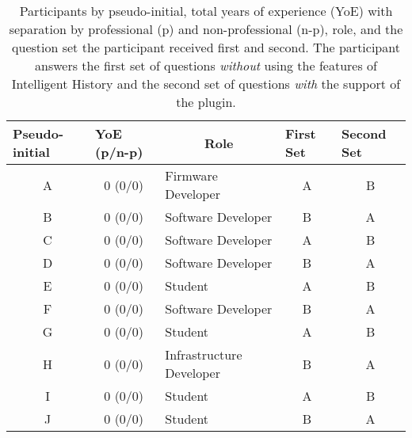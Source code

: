\begin{table}[h]
  \centering
  \begin{tabular}{@{}cclcc@{}}
  \toprule
  \multicolumn{1}{l}{Pseudo-initial} & \multicolumn{1}{l}{YoE (p/n-p)} & \multicolumn{1}{c}{Role} & \multicolumn{1}{l}{First Set} & \multicolumn{1}{l}{Second Set} \\ \midrule
  A                                  & 0 (0/0)                         & Firmware Developer       & A                                  & B                               \\
  B                                  & 0 (0/0)                         & Software Developer       & B                                  & A                               \\
  C                                  & 0 (0/0)                         & Software Developer       & A                                  & B                               \\
  D                                  & 0 (0/0)                         & Software Developer       & B                                  & A                               \\
  E                                  & 0 (0/0)                         & Student                  & A                                  & B                               \\
  F                                  & 0 (0/0)                         & Software Developer       & B                                  & A                               \\
  G                                  & 0 (0/0)                         & Student                  & A                                  & B                               \\
  H                                  & 0 (0/0)                         & Infrastructure Developer & B                                  & A                               \\
  I                                  & 0 (0/0)                         & Student                  & A                                  & B                               \\
  J                                  & 0 (0/0)                         & Student                  & B                                  & A                               \\ \bottomrule
  \end{tabular}
  \caption{
    Participants by pseudo-initial, total years of experience (YoE) with separation by professional (p) and non-professional (n-p), role, and the question set the participant received first and second.
    The participant answers the first set of questions \emph{without} using the features of Intelligent History and the second set of questions \emph{with} the support of the plugin.
  }
  \label{tab:Participants}
\end{table}

